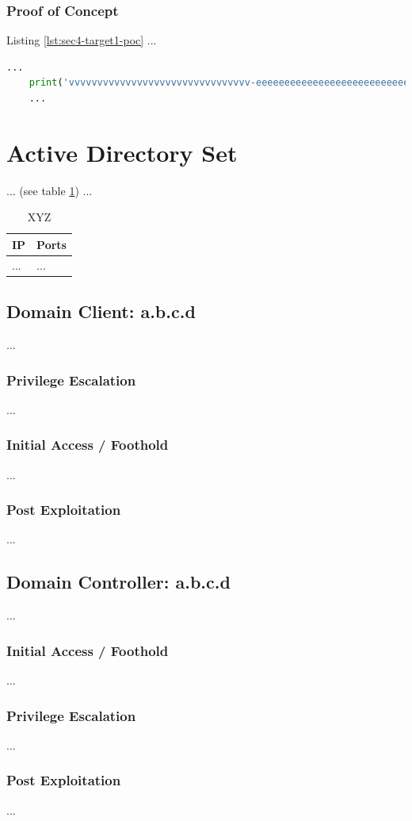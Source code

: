\subsubsection{Proof of Concept}\label{sec:sec4-target1-poc}
%
Listing \ref{lst:sec4-target1-poc} ...\\

\begin{lstlisting}[language=Python,caption={Proof of Concept}, label={lst:sec4-target1-poc}]
    ...
    print('vvvvvvvvvvvvvvvvvvvvvvvvvvvvvvvv-eeeeeeeeeeeeeeeeeeeeeeeeeeeeeeeeeeeeeeeeeee-looooooooooooooooooooooong-striiiiiiiiiiiiiing')
    ...
\end{lstlisting}
%
%
%
\section{Active Directory Set}\label{sec:sec5}
%
... (see table \ref{tbl:sec5-xyz}) ...

\begin{table}[H]
    \begin{tabularx}{\textwidth}{l|l}
        \textbf{IP} & \textbf{Ports} \\
        \hline
        ... & ...\\
    \end{tabularx}
    \caption{XYZ\label{tbl:sec5-xyz}}
\end{table}
%
%
%
\subsection{Domain Client: a.b.c.d}\label{sec:sec5-client1}
%
...
%
%
%
\subsubsection{Privilege Escalation}\label{sec:sec5-client1-priv}
%
...
%
%
%
\subsubsection{Initial Access / Foothold}\label{sec:sec5-client1-init}
%
...
%
%
%
\subsubsection{Post Exploitation}\label{sec:sec5-client1-post}
%
...
%
%
%
\subsection{Domain Controller: a.b.c.d}\label{sec:sec5-dc1}
%
...
%
%
%
\subsubsection{Initial Access / Foothold}\label{sec:sec5-dc1-init}
%
...
%
%
%
\subsubsection{Privilege Escalation}\label{sec:sec5-dc1-priv}
%
...
%
%
%
\subsubsection{Post Exploitation}\label{sec:sec5-dc1-post}
%
...
%
%
%






%
%
%


